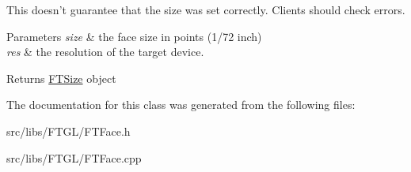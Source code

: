 This doesn't guarantee that the size was set correctly. Clients should check errors.


\begin{DoxyParams}{Parameters}
{\em size} & the face size in points (1/72 inch) \\
\hline
{\em res} & the resolution of the target device. \\
\hline
\end{DoxyParams}
\begin{DoxyReturn}{Returns}
{\ttfamily \hyperlink{class_f_t_size}{FTSize}} object 
\end{DoxyReturn}


The documentation for this class was generated from the following files:\begin{DoxyCompactItemize}
\item 
src/libs/FTGL/FTFace.h\item 
src/libs/FTGL/FTFace.cpp\end{DoxyCompactItemize}
